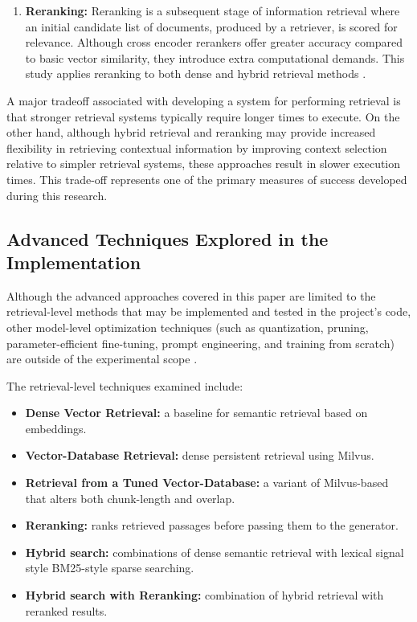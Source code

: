 \begin{enumerate}
    \item \textbf{Reranking:} Reranking is a subsequent stage of information retrieval where an initial candidate list of documents, produced by a retriever, is scored for relevance. Although cross encoder rerankers offer greater accuracy compared to basic vector similarity, they introduce extra computational demands. This study applies reranking to both dense and hybrid retrieval methods \cite{nogueira2019passage,khattab2020colbert}.
\end{enumerate}

A major tradeoff associated with developing a system for performing retrieval is that stronger retrieval systems typically require longer times to execute. On the other hand, although hybrid retrieval and reranking may provide increased flexibility in retrieving contextual information by improving context selection relative to simpler retrieval systems, these approaches result in slower execution times. This trade-off represents one of the primary measures of success developed during this research.

\subsection{Advanced Techniques Explored in the Implementation}

Although the advanced approaches covered in this paper are limited to the retrieval-level methods that may be implemented and tested in the project's code, other model-level optimization techniques (such as quantization, pruning, parameter-efficient fine-tuning, prompt engineering, and training from scratch) are outside of the experimental scope \cite{frankle2019lottery,hu2022lora,pfeiffer2021adapterfusion,liu2023pretrain}.

The retrieval-level techniques examined include:

\begin{itemize}
\item \textbf{Dense Vector Retrieval:} a baseline for semantic retrieval based on embeddings.
\item \textbf{Vector-Database Retrieval: } dense persistent retrieval using Milvus.
\item \textbf{Retrieval from a Tuned Vector-Database: } a variant of Milvus-based that alters both chunk-length and overlap.
\item \textbf{Reranking:} ranks retrieved passages before passing them to the generator.
\item \textbf{Hybrid search:} combinations of dense semantic retrieval with lexical signal style \ac{BM25}-style sparse searching. 
\item \textbf{Hybrid search with Reranking:} combination of hybrid retrieval with reranked results.
\end{itemize}

